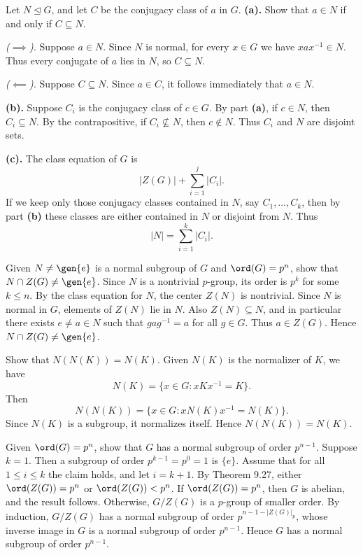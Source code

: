 \begin{problem}[Exercise 7]{
    Let $N \trianglelefteq G$, and let $C$ be the conjugacy class of $a$ in $G$.
}
    \textbf{(a).}
    Show that $a \in N$ if and only if $C \subseteq N$.

    \textit{($\implies$).}
    Suppose $a \in N$.
    Since $N$ is normal, for every $x \in G$ we have $xax^{-1} \in N$.
    Thus every conjugate of $a$ lies in $N$, so $C \subseteq N$.

    \textit{($\impliedby$).}
    Suppose $C \subseteq N$.
    Since $a \in C$, it follows immediately that $a \in N$.

    \textbf{(b).}
    Suppose $C_i$ is the conjugacy class of $c \in G$.
    By part \textbf{(a)}, if $c \in N$, then $C_i \subseteq N$.
    By the contrapositive, if $C_i \nsubseteq N$, then $c \notin N$.
    Thus $C_i$ and $N$ are disjoint sets.

    \textbf{(c).}
    The class equation of $G$ is
    \[
        |Z(G)| + \sum_{i=1}^j |C_i|.
    \]
    If we keep only those conjugacy classes contained in $N$, say $C_1,\ldots,C_k$, then by part \textbf{(b)} these classes are either contained in $N$ or disjoint from $N$.
    Thus
    \[
        |N| = \sum_{i=1}^k |C_i|.
    \]
\end{problem}

\begin{problem}[Exercise 8]{
    Given $N \neq \gen{e}$ is a normal subgroup of $G$ and $\ord(G) = p^n$, show that $N \cap Z(G) \neq \gen{e}$.
}
    Since $N$ is a nontrivial $p$-group, its order is $p^k$ for some $k \leq n$.
    By the class equation for $N$, the center $Z(N)$ is nontrivial.
    Since $N$ is normal in $G$, elements of $Z(N)$ lie in $N$.
    Also $Z(N) \subseteq N$, and in particular there exists $e \neq a \in N$ such that $ga g^{-1} = a$ for all $g \in G$.
    Thus $a \in Z(G)$.
    Hence $N \cap Z(G) \neq \gen{e}$.
\end{problem}

\begin{problem}[Exercise 9]{
    Show that $N(N(K)) = N(K)$.
}
    Given $N(K)$ is the normalizer of $K$, we have
    \[
        N(K) = \{x \in G : xKx^{-1} = K\}.
    \]
    Then
    \[
        N(N(K)) = \{x \in G : xN(K)x^{-1} = N(K)\}.
    \]
    Since $N(K)$ is a subgroup, it normalizes itself.
    Hence $N(N(K)) = N(K)$.
\end{problem}

\begin{problem}[Exercise 10]{
    Given $\ord(G) = p^n$, show that $G$ has a normal subgroup of order $p^{n-1}$.
}
    Suppose $k=1$.
    Then a subgroup of order $p^{k-1} = p^0 = 1$ is $\{e\}$.
    Assume that for all $1 \leq i \leq k$ the claim holds, and let $i = k+1$.
    By Theorem 9.27, either $\ord(Z(G)) = p^n$ or $\ord(Z(G)) < p^n$.
    If $\ord(Z(G)) = p^n$, then $G$ is abelian, and the result follows.
    Otherwise, $G/Z(G)$ is a $p$-group of smaller order.
    By induction, $G/Z(G)$ has a normal subgroup of order $p^{n-1-|Z(G)|_p}$, whose inverse image in $G$ is a normal subgroup of order $p^{n-1}$.
    Hence $G$ has a normal subgroup of order $p^{n-1}$.
\end{problem}

